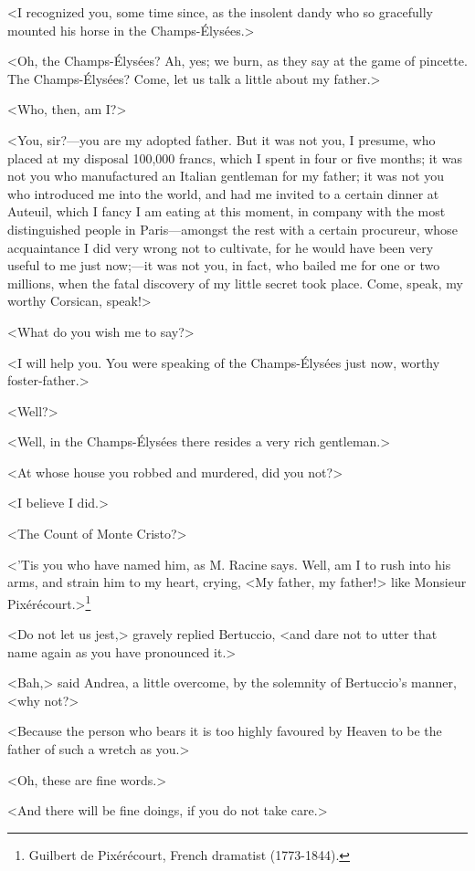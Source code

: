  <I recognized you, some time since, as the insolent dandy who so gracefully mounted his horse in the Champs-Élysées.> 

 <Oh, the Champs-Élysées? Ah, yes; we burn, as they say at the game of pincette. The Champs-Élysées? Come, let us talk a little about my father.> 

 <Who, then, am I?> 

 <You, sir?—you are my adopted father. But it was not you, I presume, who placed at my disposal 100,000 francs, which I spent in four or five months; it was not you who manufactured an Italian gentleman for my father; it was not you who introduced me into the world, and had me invited to a certain dinner at Auteuil, which I fancy I am eating at this moment, in company with the most distinguished people in Paris—amongst the rest with a certain procureur, whose acquaintance I did very wrong not to cultivate, for he would have been very useful to me just now;—it was not you, in fact, who bailed me for one or two millions, when the fatal discovery of my little secret took place. Come, speak, my worthy Corsican, speak!> 

 <What do you wish me to say?> 

 <I will help you. You were speaking of the Champs-Élysées just now, worthy foster-father.> 

 <Well?> 

 <Well, in the Champs-Élysées there resides a very rich gentleman.> 

 <At whose house you robbed and murdered, did you not?> 

 <I believe I did.> 

 <The Count of Monte Cristo?> 

 <'Tis you who have named him, as M. Racine says. Well, am I to rush into his arms, and strain him to my heart, crying, <My father, my father!> like Monsieur Pixérécourt.>\footnote{Guilbert de Pixérécourt, French dramatist (1773-1844). } 

 <Do not let us jest,> gravely replied Bertuccio, <and dare not to utter that name again as you have pronounced it.> 

 <Bah,> said Andrea, a little overcome, by the solemnity of Bertuccio's manner, <why not?> 

 <Because the person who bears it is too highly favoured by Heaven to be the father of such a wretch as you.> 

 <Oh, these are fine words.> 

 <And there will be fine doings, if you do not take care.> 

